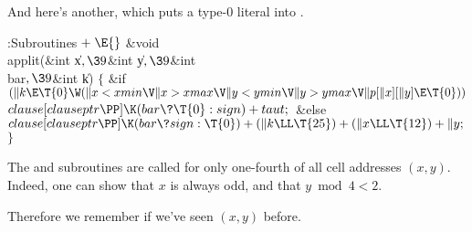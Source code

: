 And here's another, which puts a type-0 literal into .

\Y\B\4:Subroutines\X${}\mathrel+\E{}$\6
\&{void} \\{applit}(\&{int} \|x${},\39{}$\&{int} \|y${},\39{}$\&{int} %
\\{bar}${},\39{}$\&{int} \|k)\1\1\2\2\6
${}\{{}$\1\6
\&{if} ${}(\|k\E\T{0}\W(\|x<\\{xmin}\V\|x>\\{xmax}\V\|y<\\{ymin}\V\|y>\\{ymax}%
\V\|p[\|x][\|y]\E\T{0})){}$\1\5
${}\\{clause}[\\{clauseptr}\PP]\K(\\{bar}\?\T{0}:\\{sign})+\\{taut};{}$\2\6
\&{else}\1\5
${}\\{clause}[\\{clauseptr}\PP]\K(\\{bar}\?\\{sign}:\T{0})+(\|k\LL\T{25})+(\|x%
\LL\T{12})+\|y;{}$\2\6
\4${}\}{}$\2\par
\fi

The  and  subroutines are called for only
one-fourth
of all cell addresses $(x,y)$. Indeed, one can show that
$x$ is always odd, and that $y\bmod4<2$.

Therefore we remember if we've seen $(x,y)$ before.

